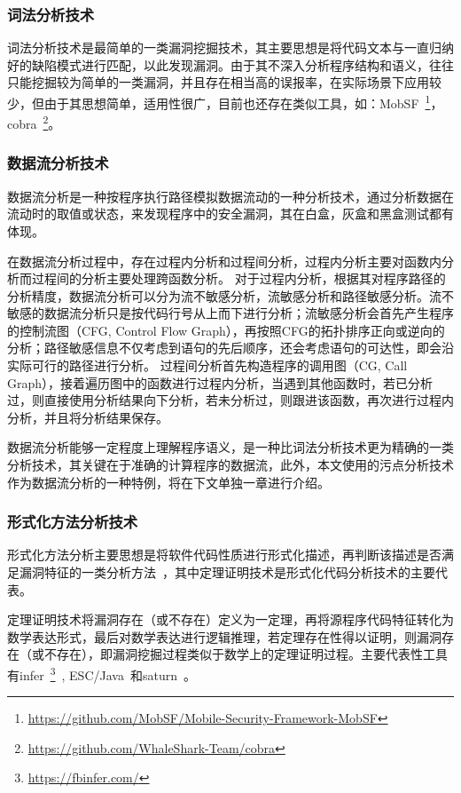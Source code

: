 \subsubsection{词法分析技术}
词法分析技术是最简单的一类漏洞挖掘技术，其主要思想是将代码文本与一直归纳好的缺陷模式进行匹配，以此发现漏洞。由于其不深入分析程序结构和语义，往往只能挖掘较为简单的一类漏洞，并且存在相当高的误报率，在实际场景下应用较少，但由于其思想简单，适用性很广，目前也还存在类似工具，如：MobSF~\footnote{\url{https://github.com/MobSF/Mobile-Security-Framework-MobSF}}，cobra~\footnote{\url{https://github.com/WhaleShark-Team/cobra}}。\\

\subsubsection{数据流分析技术}
数据流分析是一种按程序执行路径模拟数据流动的一种分析技术，通过分析数据在流动时的取值或状态，来发现程序中的安全漏洞，其在白盒，灰盒和黑盒测试都有体现。

在数据流分析过程中，存在过程内分析和过程间分析，过程内分析主要对函数内分析而过程间的分析主要处理跨函数分析。
对于过程内分析，根据其对程序路径的分析精度，数据流分析可以分为流不敏感分析，流敏感分析和路径敏感分析。流不敏感的数据流分析只是按代码行号从上而下进行分析；流敏感分析会首先产生程序的控制流图（CFG, Control Flow Graph），再按照CFG的拓扑排序正向或逆向的分析；路径敏感信息不仅考虑到语句的先后顺序，还会考虑语句的可达性，即会沿实际可行的路径进行分析。
过程间分析首先构造程序的调用图（CG, Call Graph），接着遍历图中的函数进行过程内分析，当遇到其他函数时，若已分析过，则直接使用分析结果向下分析，若未分析过，则跟进该函数，再次进行过程内分析，并且将分析结果保存。

数据流分析能够一定程度上理解程序语义，是一种比词法分析技术更为精确的一类分析技术，其关键在于准确的计算程序的数据流，此外，本文使用的污点分析技术作为数据流分析的一种特例，将在下文单独一章进行介绍。\\

\subsubsection{形式化方法分析技术}
形式化方法分析主要思想是将软件代码性质进行形式化描述，再判断该描述是否满足漏洞特征的一类分析方法~\cite{B:automatedTheoremProving}，其中定理证明技术是形式化代码分析技术的主要代表。

定理证明技术将漏洞存在（或不存在）定义为一定理，再将源程序代码特征转化为数学表达形式，最后对数学表达进行逻辑推理，若定理存在性得以证明，则漏洞存在（或不存在），即漏洞挖掘过程类似于数学上的定理证明过程。主要代表性工具有infer~\footnote{\url{https://fbinfer.com/}}~\cite{atp:infer}, ESC/Java~\cite{atp:escjava}和saturn~\cite{atp:saturn}。

